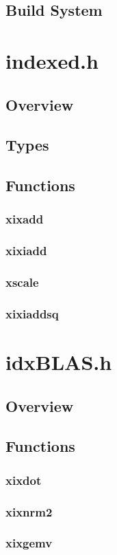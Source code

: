 \documentclass[12pt]{article}
\theoremstyle{plain}
\begin{document}
  \subsection{Build System}
\section{indexed.h}
  \subsection{Overview}
  \subsection{Types}
  \subsection{Functions}
    \subsubsection{xixadd}
    \subsubsection{xixiadd}
    \subsubsection{xscale}
    \subsubsection{xixiaddsq}
\section{idxBLAS.h}
  \subsection{Overview}
  \subsection{Functions}
    \subsubsection{xixdot}
    \subsubsection{xixnrm2}
    \subsubsection{xixgemv}
\end{document}
